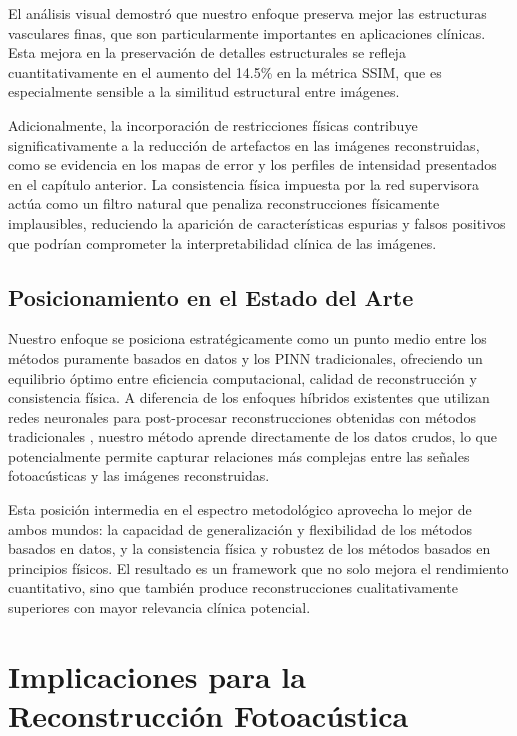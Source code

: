 El análisis visual demostró que nuestro enfoque preserva mejor las estructuras vasculares finas, que son particularmente importantes en aplicaciones clínicas. Esta mejora en la preservación de detalles estructurales se refleja cuantitativamente en el aumento del 14.5\% en la métrica SSIM, que es especialmente sensible a la similitud estructural entre imágenes.

Adicionalmente, la incorporación de restricciones físicas contribuye significativamente a la reducción de artefactos en las imágenes reconstruidas, como se evidencia en los mapas de error y los perfiles de intensidad presentados en el capítulo anterior. La consistencia física impuesta por la red supervisora actúa como un filtro natural que penaliza reconstrucciones físicamente implausibles, reduciendo la aparición de características espurias y falsos positivos que podrían comprometer la interpretabilidad clínica de las imágenes.

\subsection{Posicionamiento en el Estado del Arte}

Nuestro enfoque se posiciona estratégicamente como un punto medio entre los métodos puramente basados en datos y los PINN tradicionales, ofreciendo un equilibrio óptimo entre eficiencia computacional, calidad de reconstrucción y consistencia física. A diferencia de los enfoques híbridos existentes que utilizan redes neuronales para post-procesar reconstrucciones obtenidas con métodos tradicionales \cite{guan2020fully}, nuestro método aprende directamente de los datos crudos, lo que potencialmente permite capturar relaciones más complejas entre las señales fotoacústicas y las imágenes reconstruidas.

Esta posición intermedia en el espectro metodológico aprovecha lo mejor de ambos mundos: la capacidad de generalización y flexibilidad de los métodos basados en datos, y la consistencia física y robustez de los métodos basados en principios físicos. El resultado es un framework que no solo mejora el rendimiento cuantitativo, sino que también produce reconstrucciones cualitativamente superiores con mayor relevancia clínica potencial.

\section{Implicaciones para la Reconstrucción Fotoacústica}


